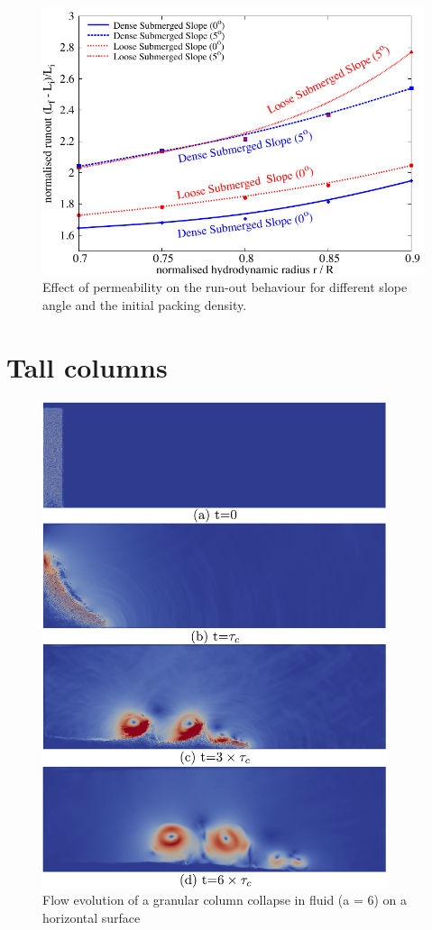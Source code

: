 \begin{figure}
\centering
\includegraphics[width=0.97\columnwidth]{Perm_Runout_slope}
\caption{Effect of permeability on the run-out behaviour for different slope 
angle and the initial packing density.}
\label{fig:Perm_Runout_slope}
\end{figure}


\section{Tall columns}

\begin{figure}[htpb]
\centering
\includegraphics[width=0.9\textwidth]{LBM_DEM_a6}
\caption{Flow evolution of a granular column collapse in fluid (a = 6) on a 
horizontal surface}
\label{fig:LBM_DEM_a6}
\end{figure}


